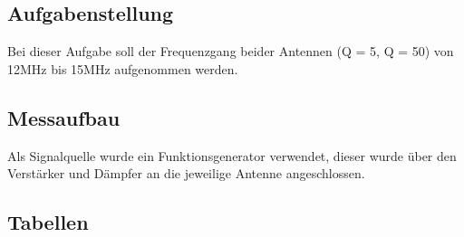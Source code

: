 \documentclass[12pt,a4paper,ngerman]{article}
\begin{document}
\subsection{Aufgabenstellung}
Bei dieser Aufgabe soll der Frequenzgang beider Antennen (Q = 5, Q = 50) von 12MHz bis 15MHz aufgenommen werden.\\

\subsection{Messaufbau}
Als Signalquelle wurde ein Funktionsgenerator verwendet, dieser wurde über den Verstärker und Dämpfer an die jeweilige Antenne angeschlossen. 

\subsection{Tabellen}
\end{document}
